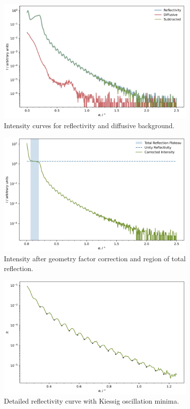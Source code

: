 \begin{figure}[H]
	\centering
	\includegraphics[width=0.88\textwidth]{content/plots/5.jpg}
	\caption{Intensity curves for reflectivity and diffusive background.}
	\label{fig:reflex-diffuse}
\end{figure}

\begin{figure}[H]
	\centering
	\includegraphics[width=0.88\textwidth]{content/plots/6.jpg}
	\caption{Intensity after geometry factor correction and region of total reflection.}
	\label{fig:geom-corr}
\end{figure}

\begin{figure}[H]
	\centering
	\includegraphics[width=0.88\textwidth]{content/plots/7.jpg}
	\caption{Detailed reflectivity curve with Kiessig oscillation minima.}
	\label{fig:kiessig-peaks}
\end{figure}

